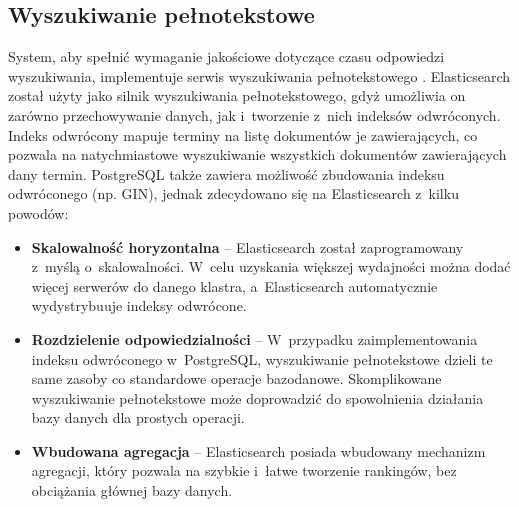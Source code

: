\subsection*{Wyszukiwanie pełnotekstowe}
System, aby spełnić wymaganie jakościowe dotyczące czasu odpowiedzi wyszukiwania, implementuje serwis wyszukiwania pełnotekstowego \cite{elasticsearch_guide}. 
Elasticsearch został użyty jako silnik wyszukiwania pełnotekstowego, gdyż umożliwia on zarówno przechowywanie danych, jak i~tworzenie z~nich indeksów odwróconych. 
Indeks odwrócony mapuje terminy na listę dokumentów je zawierających, co pozwala na natychmiastowe wyszukiwanie wszystkich dokumentów zawierających dany termin. PostgreSQL 
także zawiera możliwość zbudowania indeksu odwróconego (np. GIN), jednak zdecydowano się na Elasticsearch z~kilku powodów:
\begin{itemize}
    \item \textbf{Skalowalność horyzontalna} -- Elasticsearch został zaprogramowany z~myślą o~skalowalności. W~celu uzyskania większej wydajności można dodać więcej 
    serwerów do danego klastra, a~Elasticsearch automatycznie wydystrybuuje indeksy odwrócone.
    \item \textbf{Rozdzielenie odpowiedzialności} -- W~przypadku zaimplementowania indeksu odwróconego w~PostgreSQL, wyszukiwanie pełnotekstowe 
    dzieli te same zasoby co standardowe operacje bazodanowe. Skomplikowane wyszukiwanie pełnotekstowe może doprowadzić do spowolnienia działania bazy danych dla prostych operacji.
    \item \textbf{Wbudowana agregacja} -- Elasticsearch posiada wbudowany mechanizm agregacji, który pozwala na szybkie i~łatwe tworzenie rankingów, bez obciążania głównej bazy danych.  
\end{itemize}   
